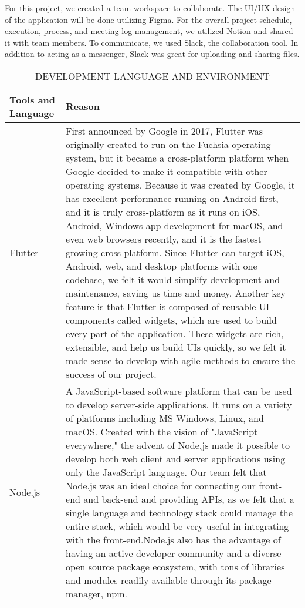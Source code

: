 \documentclass[conference]{IEEEtran}
\begin{document}
For this project, we created a team workspace to collaborate. The UI/UX design of the application will be done utilizing Figma. For the overall project schedule, execution, process, and meeting log management, we utilized Notion and shared it with team members. To communicate, we used Slack, the collaboration tool. In addition to acting as a messenger, Slack was great for uploading and sharing files.

\begin{table}[ht]
\caption{DEVELOPMENT LANGUAGE AND ENVIRONMENT}
\begin{tabular}{| p{2.9cm}|p{4.5cm} |}

\hline
Tools and Language & Reason  \\
\hline
Flutter
& First announced by Google in 2017, Flutter was originally created to run on the Fuchsia operating system, but it became a cross-platform platform when Google decided to make it compatible with other operating systems.
Because it was created by Google, it has excellent performance running on Android first, and it is truly cross-platform as it runs on iOS, Android, Windows app development for macOS, and even web browsers recently, and it is the fastest growing cross-platform.
Since Flutter can target iOS, Android, web, and desktop platforms with one codebase, we felt it would simplify development and maintenance, saving us time and money. Another key feature is that Flutter is composed of reusable UI components called widgets, which are used to build every part of the application. These widgets are rich, extensible, and help us build UIs quickly, so we felt it made sense to develop with agile methods to ensure the success of our project.\\

\hline
Node.js 
& A JavaScript-based software platform that can be used to develop server-side applications.
It runs on a variety of platforms including MS Windows, Linux, and macOS. Created with the vision of "JavaScript everywhere," the advent of Node.js made it possible to develop both web client and server applications using only the JavaScript language.
Our team felt that Node.js was an ideal choice for connecting our front-end and back-end and providing APIs, as we felt that a single language and technology stack could manage the entire stack, which would be very useful in integrating with the front-end.Node.js also has the advantage of having an active developer community and a diverse open source package ecosystem, with tons of libraries and modules readily available through its package manager, npm.
 \\
\hline
\end{tabular}
\end{table}
\end{document}
